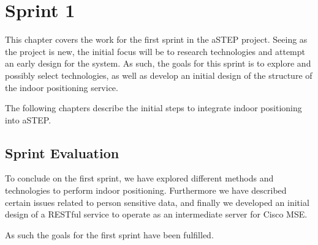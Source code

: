 \chapter{Sprint 1}
This chapter covers the work for the first sprint in the aSTEP project. Seeing as the project is new, the initial focus will be to research technologies and attempt an early design for the system. As such, the goals for this sprint is to explore and possibly select technologies, as well as develop an initial design of the structure of the indoor positioning service. 

The following chapters describe the initial steps to integrate indoor positioning into aSTEP.





\section{Sprint Evaluation}
To conclude on the first sprint, we have explored different methods and technologies to perform indoor positioning. Furthermore we have described certain issues related to person sensitive data, and finally we developed an initial design of a RESTful service to operate as an intermediate server for Cisco MSE. 

As such the goals for the first sprint have been fulfilled.